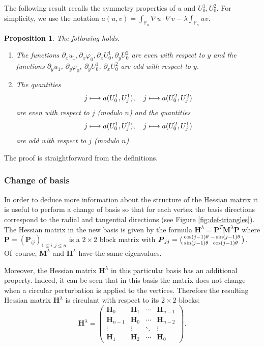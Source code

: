 \documentclass[JEP,XML,SOM,Unicode,ThmDefs,NoFloatCountersInSection,published]{cedram}
\newenvironment{smallpmatrix}{\big(\begin{smallmatrix}}{\end{smallmatrix}\big)}
\def\mto{\mathchoice{\longmapsto}{\mapsto}{\mapsto}{\mapsto}}
\theoremstyle{plain}
\newtheorem{propo}[thm]{Proposition}
\theoremstyle{definition}
\newcommand{\bo}[1]{{\boldsymbol#1}}
\def\Pp{{\mathbb{P}_n}}
\begin{document}
The following result recalls the symmetry properties of $u$ and $U_0^1,U_0^2$. For simplicity, we use the notation $a(u,v) = \int_{\Pp} \nabla u \cdot \nabla v - \lambda \int_{\Pp} uv$.
\begin{propo}\label{prop:parity-u}
The following holds.
\begin{enumerate}
\item
The functions $\partial_x u_1, \partial_x \varphi_0, \partial_x U_0^1, \partial_y U_0^2$ are even with respect to $y$
and the functions $\partial_y u_1$, $\partial_y \varphi_0$, $\partial_y U_0^1$, $\partial_x U_0^2$ are odd with respect to $y$.

\item
The quantities
\[
j \mto a(U_0^1,U_j^1),\quad j \mto a(U_0^2,U_j^2)
\]
are even with respect to $j$ (modulo $n$)
and the quantities
\[
j \mto a(U_0^1,U_j^2),\quad j \mto a(U_0^2,U_j^1)
\]
are odd with respect to $j$ (modulo $n$).
\end{enumerate}
\end{propo}
The proof is straightforward from the definitions.

\subsubsection*{Change of basis} In order to deduce more information about the structure of the Hessian matrix it is useful to perform a change of basis so that for each vertex the basis directions correspond to the radial and tangential directions (see Figure \ref{fig:def-triangles}). The Hessian matrix in the new basis is given by the formula $\bo H^\lambda = \bo P^T \bo M^\lambda \bo P$ where $\bo P = (\bo P_{ij})_{1\leq i,j\leq n}$ is a $2\times 2$ block matrix with $\bo P_{jj} = \begin{smallpmatrix}
\cos(j-1)\theta & -\sin(j-1)\theta \\
\sin(j-1)\theta & \cos(j-1)\theta
\end{smallpmatrix}$. Of~course, $\bo M^\lambda$ and $\bo H^\lambda$ have the same eigenvalues.

Moreover, the Hessian matrix $\bo H^\lambda$ in this particular basis has an additional property. Indeed, it can be seen that in this basis the matrix does not change when a circular perturbation is applied to the vertices. Therefore the resulting Hessian matrix $\bo H^\lambda$ is circulant with respect to its $2\times 2$ blocks:
\begin{equation}
\bo H^\lambda = \begin{pmatrix}
\bo H_0 & \bo H_1 & \cdots & \bo H_{n-1} \\
\bo H_{n-1} & \bo H_0 & \cdots & \bo H_{n-2} \\
\vdots & \vdots & \ddots & \vdots \\
\bo H_1 & \bo H_2 & \cdots & \bo H_0
\end{pmatrix}.
\label{eq:circulant-hessian}
\end{equation}
\end{document}
